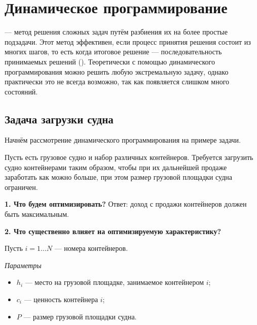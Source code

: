 \chapter{Динамическое программирование}

\begin{note}
	 --- метод решения сложных задач путём разбиения их на более простые подзадачи. Этот метод эффективен, если процесс принятия  решения состоит из многих шагов, то есть когда итоговое решение --- последовательность принимаемых решений (). Теоретически с помощью динамического программирования можно решить любую экстремальную задачу, однако практически это не всегда возможно, так как появляется слишком много состояний.
\end{note}

\section{Задача загрузки судна}

Начнём рассмотрение динамического программирования на примере задачи.

\label{pr:loading_vessel}

Пусть есть грузовое судно и набор различных контейнеров. Требуется загрузить судно контейнерами таким образом, чтобы при их дальнейшей продаже заработать как можно больше, при этом размер грузовой площадки судна ограничен.

\mathmodel

\textbf{1. Что будем оптимизировать?} Ответ: доход с продажи контейнеров должен быть максимальным.

\bigskip

\textbf{2. Что существенно влияет на оптимизируемую характеристику?}

Пусть $i=1 \dots N$ --- номера контейнеров.

\bigskip

\textit{Параметры}

\begin{itemize}[nosep]
	\item $h_i$ --- место на грузовой площадке, занимаемое контейнером $i$;
	
	\item $c_i$ --- ценность контейнера $i$;
	
	\item $P$ --- размер грузовой площадки судна.
\end{itemize}

